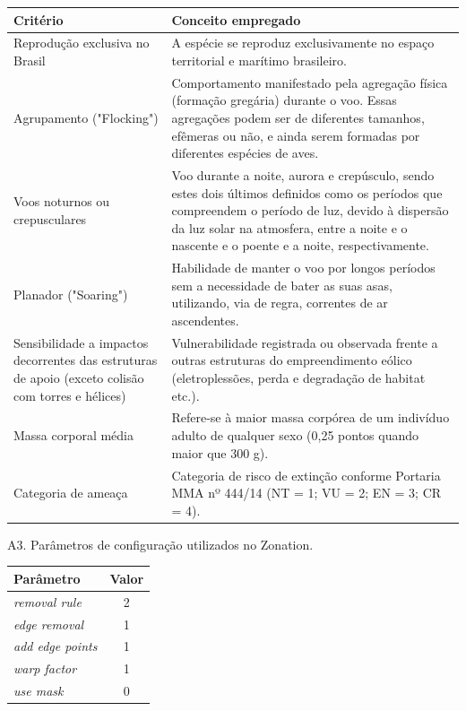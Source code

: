 \documentclass[
  oneside]{scrbook}
\begin{document}
\begin{longtable}[t]{>{\raggedright\arraybackslash}p{5cm}>{\raggedright\arraybackslash}p{10cm}}
\toprule
Critério & Conceito empregado\\
\midrule
Reprodução exclusiva no Brasil & A espécie se reproduz exclusivamente no espaço territorial e marítimo brasileiro.\\
Agrupamento ("Flocking") & Comportamento manifestado pela agregação física (formação gregária) durante o voo. Essas agregações podem ser de diferentes tamanhos, efêmeras ou não, e ainda serem formadas por diferentes espécies de aves.\\
Voos noturnos ou crepusculares & Voo durante a noite, aurora e crepúsculo, sendo estes dois últimos definidos como os períodos que compreendem o período de luz, devido à dispersão da luz solar na atmosfera, entre a noite e o nascente e o poente e a noite, respectivamente.\\
Planador ("Soaring") & Habilidade de manter o voo por longos períodos sem a necessidade de bater as suas asas, utilizando, via de regra, correntes de ar ascendentes.\\
Sensibilidade a impactos decorrentes das estruturas de apoio (exceto colisão com torres e hélices) & Vulnerabilidade registrada ou observada frente a outras estruturas do empreendimento eólico (eletroplessões, perda e degradação de habitat etc.).\\
\addlinespace
Massa corporal média & Refere-se à maior massa corpórea de um indivíduo adulto de qualquer sexo (0,25 pontos quando maior que 300 g).\\
Categoria de ameaça & Categoria de risco de extinção conforme Portaria MMA nº 444/14 (NT = 1; VU = 2; EN = 3; CR = 4).\\
\bottomrule
\end{longtable}

A3. Parâmetros de configuração utilizados no Zonation.

\begin{longtable}[t]{>{}lc}
\toprule
Parâmetro & Valor\\
\midrule
\em{removal rule} & 2\\
\em{edge removal} & 1\\
\em{add edge points} & 1\\
\em{warp factor} & 1\\
\em{use mask} & 0\\
\bottomrule
\end{longtable}
\end{document}
